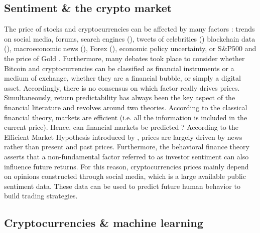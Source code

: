 \documentclass{article}
\begin{document}
	\subsection{Sentiment \& the crypto market}
	
	The price of stocks and cryptocurrencies can be affected by many factors : trends on social media, forums, search engines (\cite{aobpu}), tweets of celebrities (\cite{dbrtt}) blockchain data (\cite{pepwm}), macroeconomic news (\cite{tiomn}),  Forex (\cite{nsitc}), economic policy uncertainty, or S\&P500 and the price of Gold \cite{aobpu}. Furthermore, many debates took place to consider whether Bitcoin and cryptocurrencies can be classified as financial instruments or a medium of exchange, whether they are a financial bubble, or simply a digital asset. Accordingly, there is no consensus on which factor really drives prices. Simultaneously, return predictability has always been the key aspect of the financial literature and revolves around two theories. According to the classical financial theory, markets are efficient (i.e. all the information is included in the current price). Hence, can financial markets be predicted ? According to the Efficient Market Hypothesis introduced by \cite{tbosm}, prices are largely driven by news rather than present and past prices. Furthermore, the behavioral finance theory asserts that a non-fundamental factor referred to as investor sentiment can also influence future returns. For this reason, cryptocurrencies prices mainly depend on opinions constructed through social media, which is a large available public sentiment data. These data can be used to predict future human behavior to build trading strategies.
	
	\subsection{Cryptocurrencies \& machine learning}
	
\end{document}
